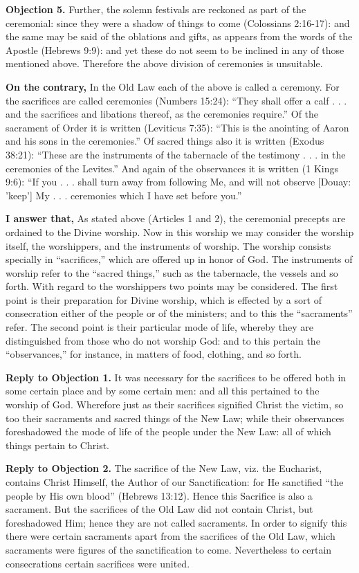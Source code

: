 \textbf{Objection 5.} Further, the solemn festivals are reckoned as part of the ceremonial: since they were a shadow of things to come (Colossians 2:16-17): and the same may be said of the oblations and gifts, as appears from the words of the Apostle (Hebrews 9:9): and yet these do not seem to be inclined in any of those mentioned above. Therefore the above division of ceremonies is unsuitable.

\textbf{On the contrary,} In the Old Law each of the above is called a ceremony. For the sacrifices are called ceremonies (Numbers 15:24): ``They shall offer a calf . . . and the sacrifices and libations thereof, as the ceremonies require.'' Of the sacrament of Order it is written (Leviticus 7:35): ``This is the anointing of Aaron and his sons in the ceremonies.'' Of sacred things also it is written (Exodus 38:21): ``These are the instruments of the tabernacle of the testimony . . . in the ceremonies of the Levites.'' And again of the observances it is written (1 Kings 9:6): ``If you . . . shall turn away from following Me, and will not observe [Douay: 'keep'] My . . . ceremonies which I have set before you.''

\textbf{I answer that,} As stated above (Articles 1 and 2), the ceremonial precepts are ordained to the Divine worship. Now in this worship we may consider the worship itself, the worshippers, and the instruments of worship. The worship consists specially in ``sacrifices,'' which are offered up in honor of God. The instruments of worship refer to the ``sacred things,'' such as the tabernacle, the vessels and so forth. With regard to the worshippers two points may be considered. The first point is their preparation for Divine worship, which is effected by a sort of consecration either of the people or of the ministers; and to this the ``sacraments'' refer. The second point is their particular mode of life, whereby they are distinguished from those who do not worship God: and to this pertain the ``observances,'' for instance, in matters of food, clothing, and so forth.

\textbf{Reply to Objection 1.} It was necessary for the sacrifices to be offered both in some certain place and by some certain men: and all this pertained to the worship of God. Wherefore just as their sacrifices signified Christ the victim, so too their sacraments and sacred things of the New Law; while their observances foreshadowed the mode of life of the people under the New Law: all of which things pertain to Christ.

\textbf{Reply to Objection 2.} The sacrifice of the New Law, viz. the Eucharist, contains Christ Himself, the Author of our Sanctification: for He sanctified ``the people by His own blood'' (Hebrews 13:12). Hence this Sacrifice is also a sacrament. But the sacrifices of the Old Law did not contain Christ, but foreshadowed Him; hence they are not called sacraments. In order to signify this there were certain sacraments apart from the sacrifices of the Old Law, which sacraments were figures of the sanctification to come. Nevertheless to certain consecrations certain sacrifices were united.

